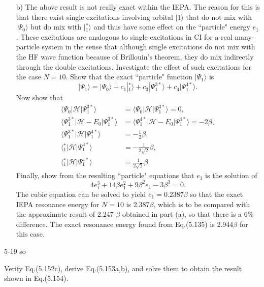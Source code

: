\documentclass[a4paper]{book}
\begin{document}
\begin{exercise}
\begin{enumerate}
	\item[b)] The above result is not really exact within the IEPA. The reason for this is that there exist single excitations involving orbital $|1\rangle$ that do not mix with $|\Psi_0\rangle$ but do mix with $|{}^{*}_1 \rangle$ and thus have some effect on the ``particle" energy $e_1$. These excitations are analogous to single excitations in CI for a real many-particle system in the sense that although single excitations do not mix with the HF wave function because of Brillouin's theorem, they do mix indirectly through the double excitations. Investigate the effect of such excitations for the case $N=10$. Show that the exact ``particle" function $| \Psi_1 \rangle$ is
	\[
		| \Psi_1 \rangle = | \Psi_0 \rangle + c_1 |{}^{*}_1 \rangle + c_3 | \Psi^{3*}_1 \rangle + c_4 | \Psi^{4*}_1 \rangle.
	\]
	Now show that
	\begin{align*}
		\langle \Psi_0 | \mathscr{H} | \Psi^{3*}_1 \rangle &= \langle \Psi_0 | \mathscr{H} | \Psi^{3*}_1 \rangle = 0, \\
		\langle \Psi^{3*}_1 | \mathscr{H} - E_0 | \Psi^{3*}_1 \rangle &= \langle \Psi^{4*}_1 | \mathscr{H} - E_0 | \Psi^{4*}_1 \rangle = -2 \beta , \\
		\langle \Psi^{3*}_1 | \mathscr{H} | \Psi^{4*}_1 \rangle &= -\frac{1}{2} \beta , \\
		\langle {}^{*}_1 | \mathscr{H} | \Psi^{3*}_1 \rangle &= -\frac{1}{2\sqrt{2}} \beta , \\
		\langle {}^{*}_1 | \mathscr{H} | \Psi^{4*}_1 \rangle &= \frac{1}{2\sqrt{2}} \beta.
	\end{align*}
	Finally, show from  the resulting ``particle" equations that $e_1$ is the solution of 
	\[
		4e^3_1 + 14 \beta e^2_1 + 9 \beta^2 e_1 - 3\beta^3 = 0.
	\]
	The cubic equation can be solved to yield $e_1 = 0.2387 \beta$ so that the exact IEPA resonance energy for $N=10$ is 2.387$\beta$, which is to be compared with the approximate result of 2.247 $\beta$ obtained in part (a), so that there is a 6\% difference. The exact resonance energy found from Eq.(5.135) is 2.944$\beta$ for this case.
	\end{enumerate}
	\end{exercise}
	
	\begin{solution}
		5-19 so
	\end{solution}
	
	\begin{exercise}
	Verify Eq.(5.152c), derive Eq.(5.153a,b), and solve them to obtain the result shown in Eq.(5.154).
	\end{exercise}
	
\end{document}
